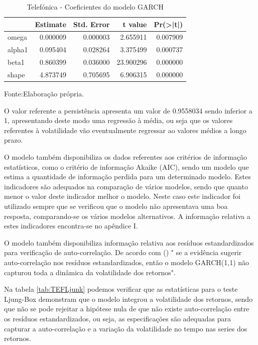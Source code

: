 \documentclass[
  12pt,
  a4paper,
  openany]{book}
\theoremstyle{definition}
\theoremstyle{definition}
\theoremstyle{definition}
\theoremstyle{remark}
\begin{document}
\normalsize

\begin{table}[!h]

\caption{\label{tab:tefcoefgarch}Telefónica - Coeficientes do modelo GARCH}
\centering
\begin{tabular}[t]{lrrrr}
\toprule
  &  Estimate &  Std. Error &  t value & Pr(>|t|)\\
\midrule
omega & 0.000009 & 0.000003 & 2.655911 & 0.007909\\
alpha1 & 0.095404 & 0.028264 & 3.375499 & 0.000737\\
beta1 & 0.860399 & 0.036000 & 23.900296 & 0.000000\\
shape & 4.873749 & 0.705695 & 6.906315 & 0.000000\\
\bottomrule
\end{tabular}
\end{table}
\FloatBarrier
\centering

Fonte:Elaboração própria.

\justifying
\bigskip

O valor referente a persistência apresenta um valor de 0.9558034 sendo inferior a 1, apresentando deste modo uma regressão à média, ou seja que os valores referentes à volatilidade vão eventualmente regressar ao valores médios a longo prazo.

O modelo também disponibiliza os dados referentes aos critérios de informação estatísticos, como o critério de informação Akaike (AIC), sendo um modelo que estima a quantidade de informação perdida para um determinado modelo. Estes indicadores são adequados na comparação de vários modelos, sendo que quanto menor o valor deste indicador melhor o modelo. Neste caso este indicador foi utilizado sempre que se verificou que o modelo não apresentava uma boa resposta, comparando-se os vários modelos alternativos. A informação relativa a estes indicadores encontra-se no apêndice I.

O modelo também disponibiliza informação relativa aos resíduos estandardizados para verificação de auto-correlação. De acordo com (\citet{rvol}) " se a evidência sugerir auto-correlação nos resíduos estandardizados, então o modelo GARCH(1,1) não capturou toda a dinâmica da volatilidade dos retornos".

Na tabela \ref{tab:TEFLjunk} podemos verificar que as estatísticas para o teste Ljung-Box demonstram que o modelo integrou a volatilidade dos retornos, sendo que não se pode rejeitar a hipótese nula de que não existe auto-correlação entre os resíduos estandardizados, ou seja, as especificações são adequadas para capturar a auto-correlação e a variação da volatilidade no tempo nas series dos retornos.
\end{document}
